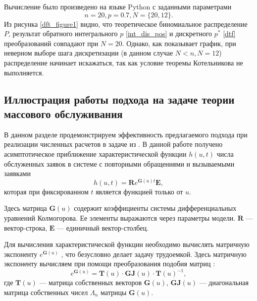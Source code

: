 Вычисление было произведено на языке Python с заданными параметрами
\begin{equation*}
	n=20,p = 0.7,N = \{20,12\}.
\end{equation*}
Из рисунка \ref{dft_figure1} видно, что теоретическое биномиальное распределение $P$, результат обратного интегрального $p$ \eqref{int_dis_pos} и дискретного $p^*$ \eqref{dtf} преобразований совпадают при $N=20$. Однако, как показывает график, при неверном выборе шага дискретизации (в данном случае $N < n, N = 12$) распределение начинает искажаться, так как условие теоремы Котельникова \cite{ястребов2012дискретизация} не выполняется.
\subsection{Иллюстрация работы подхода на задаче теории массового обслуживания}\label{rq_3}
В данном разделе продемонстрируем эффективность предлагаемого подхода при реализации численных расчетов в задаче из \cite{blaginin2021approximation}. В данной работе получено асимптотическое приближение характеристической функции $h(u,t)$ числа обслуженных заявок в системе с повторными обращениями и вызываемыми заявками
\begin{equation}
	h(u,t)=\boldsymbol{R}e^{\boldsymbol{G}(u)t}\boldsymbol{E},
\end{equation}
которая при фиксированном $t$ является функцией только от $u$.

Здесь матрица $\boldsymbol{G}(u)$ содержит коэффициенты системы дифференциальных уравнений Колмогорова. Ее элементы выражаются через параметры модели. $\boldsymbol{R}$ --- вектор-строка, $\boldsymbol{E}$ --- единичный вектор-столбец.

Для вычисления характеристической функции необходимо вычислять матричную экспоненту $e^{\boldsymbol{G}(u)}$ , что безусловно делает задачу трудоемкой. Здесь матричную экспоненту вычисляем при помощи преобразования подобия матриц \cite{bronson1991matrix}:
\begin{equation*}
	e^{\boldsymbol{G}(u)}=\boldsymbol{T}(u)\cdot %
	\boldsymbol{GJ}(u)
	\cdot \boldsymbol{T}(u)^{-1},
\end{equation*}
где $\boldsymbol{T}(u)$ --- матрица собственных векторов $\boldsymbol{G}(u)$, $\boldsymbol{GJ}(u)$ --- диагональная матрица собственных чисел $\Lambda_{n}$ матрицы $\boldsymbol{G}(u)$.

